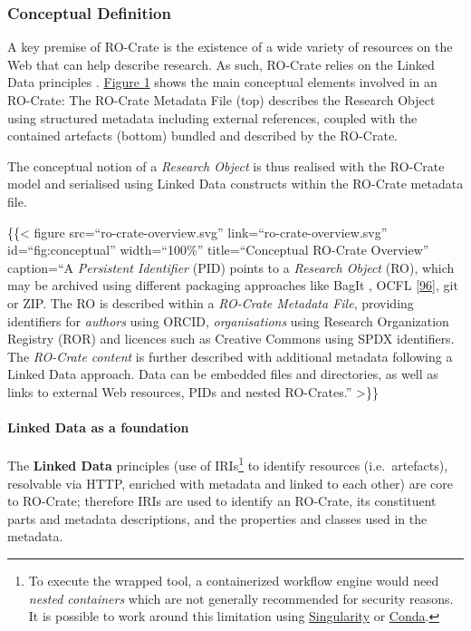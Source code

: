 {\hypertarget{conceptual}{%
\subsubsection{Conceptual Definition}\label{conceptual}}

A key premise of RO-Crate is the existence of a wide variety of
resources on the Web that can help describe research. As such, RO-Crate
relies on the Linked Data principles
\cite{ch5-63}.
\protect\hyperlink{fig:conceptual}{Figure 1} shows the main conceptual
elements involved in an RO-Crate: The RO-Crate Metadata File (top)
describes the Research Object using structured metadata including
external references, coupled with the contained artefacts (bottom)
bundled and described by the RO-Crate.

The conceptual notion of a \emph{Research Object}
\cite{ch5-12}
is thus realised with the RO-Crate model and serialised using Linked
Data constructs within the RO-Crate metadata file.

\{\{\textless{} figure src=``ro-crate-overview.svg''
link=``ro-crate-overview.svg'' id=``fig:conceptual'' width=``100\%''
title=``Conceptual RO-Crate Overview'' caption=``A \emph{Persistent
Identifier} (PID)
\cite{ch5-86} points to
a \emph{Research Object} (RO), which may be archived using different
packaging approaches like BagIt
\cite{ch5-74}, OCFL
\href{https://ocfl.io/1.0/spec/}{{[}96{]}}, git or ZIP. The RO is
described within a \emph{RO-Crate Metadata File}, providing identifiers
for \emph{authors} using ORCID, \emph{organisations} using Research
Organization Registry (ROR)
\cite{ch5-79} and licences such as
Creative Commons using SPDX identifiers. The \emph{RO-Crate content} is
further described with additional metadata following a Linked Data
approach. Data can be embedded files and directories, as well as links
to external Web resources, PIDs and nested RO-Crates.'' \textgreater\}\}

\hypertarget{linkeddata}{%
\paragraph{Linked Data as a foundation}\label{linkeddata}}

The \textbf{Linked Data} principles
\cite{Bizer 2011} (use of
IRIs\footnote{To execute the wrapped tool, a containerized workflow
  engine would need \emph{nested containers} which are not generally
  recommended for security reasons. It is possible to work around this
  limitation using \href{https://sylabs.io/singularity/}{Singularity} or
  \href{https://docs.bioexcel.eu/cwl-best-practice-guide/devpractice/containers/conda.html}{Conda}.}
to identify resources (i.e.~artefacts), resolvable via HTTP, enriched
with metadata and linked to each other) are core to RO-Crate; therefore
IRIs are used to identify an RO-Crate, its constituent parts and
metadata descriptions, and the properties and classes used in the
metadata.

}
